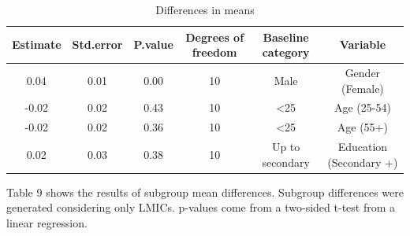 \documentclass[
  12pt,
]{article}
\begin{document}
\begin{table}[!h]

\caption{\label{tab:dmeans}Differences in means}
\centering
\fontsize{10}{12}\selectfont
\begin{threeparttable}
\begin{tabular}[t]{cccccc}
\toprule
\textbf{Estimate} & \textbf{Std.error} & \textbf{P.value} & \textbf{Degrees of freedom} & \textbf{Baseline category} & \textbf{Variable}\\
\midrule
0.04 & 0.01 & 0.00 & 10 & Male & Gender (Female)\\
-0.02 & 0.02 & 0.43 & 10 & <25 & Age (25-54)\\
-0.02 & 0.02 & 0.36 & 10 & <25 & Age (55+)\\
0.02 & 0.03 & 0.38 & 10 & Up to secondary & Education (Secondary +)\\
\bottomrule
\end{tabular}
\begin{tablenotes}
\item Table 9 shows the results of subgroup mean differences. Subgroup differences were generated considering only LMICs. p-values come from a two-sided t-test from a linear regression.
\end{tablenotes}
\end{threeparttable}
\end{table}

\pagebreak
\end{document}
